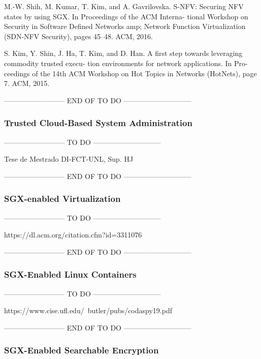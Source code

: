 M.-W. Shih, M. Kumar, T. Kim, and A. Gavrilovska. S-NFV: Securing NFV states by
using SGX. In Proceedings of the ACM Interna- tional Workshop on Security in
Software Defined Networks amp; Network Function Virtualization (SDN-NFV Security),
pages 45–48. ACM, 2016.

S. Kim, Y. Shin, J. Ha, T. Kim, and D. Han. A first step towards leveraging commodity
trusted execu- tion environments for network applications. In Pro- ceedings of the
14th ACM Workshop on Hot Topics in Networks (HotNets), page 7. ACM, 2015.

-------------------------- END OF TO DO -----------------------------

\subsubsection{Trusted Cloud-Based System Administration}

-------------------------- TO DO -----------------------------

Tese de Mestrado DI-FCT-UNL, Sup. HJ

-------------------------- END OF TO DO -----------------------------

\subsubsection{SGX-enabled Virtualization}

-------------------------- TO DO -----------------------------

https://dl.acm.org/citation.cfm?id=3311076

-------------------------- END OF TO DO -----------------------------

\subsubsection{SGX-Enabled Linux Containers}

-------------------------- TO DO -----------------------------

https://www.cise.ufl.edu/~butler/pubs/codaspy19.pdf

-------------------------- END OF TO DO -----------------------------

\subsubsection{SGX-Enabled Searchable Encryption}

